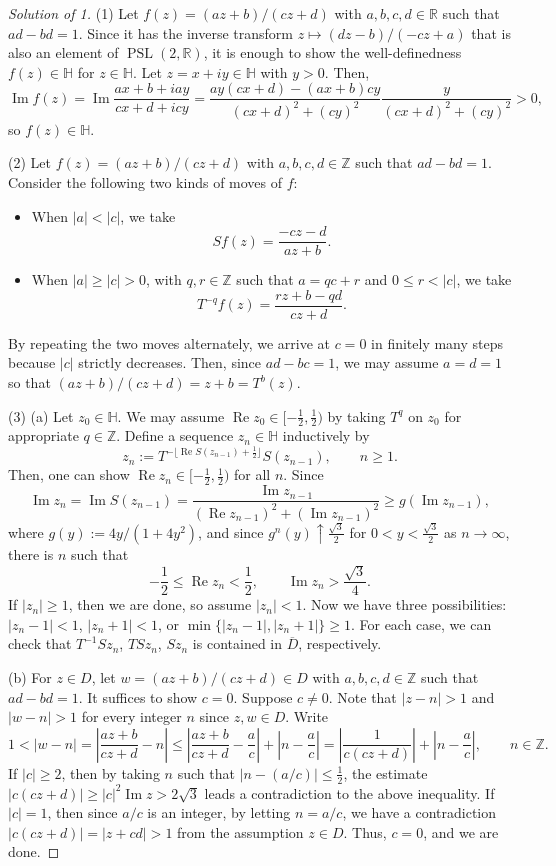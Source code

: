 \documentclass[a4paper]{article}
\theoremstyle{definition}
\renewcommand{\Re}{\operatorname{Re}}
\renewcommand{\Im}{\operatorname{Im}}
\renewcommand{\H}{\mathbb{H}}
\newcommand{\R}{\mathbb{R}}
\newcommand{\Z}{\mathbb{Z}}
\newcommand{\PSL}{\operatorname{PSL}}
\renewcommand{\bar}{\overline}
\begin{document}
\begin{proof}[Solution of 1]
(1)
Let $f(z)=(az+b)/(cz+d)$ with $a,b,c,d\in\R$ such that $ad-bd=1$.
Since it has the inverse transform $z\mapsto(dz-b)/(-cz+a)$ that is also an element of $\PSL(2,\R)$, it is enough to show the well-definedness $f(z)\in\H$ for $z\in\H$.
Let $z=x+iy\in\H$ with $y>0$.
Then,
\[\Im f(z)=\Im\frac{ax+b+iay}{cx+d+icy}=\frac{ay(cx+d)-(ax+b)cy}{(cx+d)^2+(cy)^2}\frac y{(cx+d)^2+(cy)^2}>0,\]
so $f(z)\in\H$.

(2)
Let $f(z)=(az+b)/(cz+d)$ with $a,b,c,d\in\Z$ such that $ad-bd=1$.
Consider the following two kinds of moves of $f$:
\begin{itemize}
\item When $|a|<|c|$, we take
\[Sf(z)=\frac{-cz-d}{az+b}.\]
\item When $|a|\ge|c|>0$, with $q,r\in\Z$ such that $a=qc+r$ and $0\le r<|c|$, we take
\[T^{-q}f(z)=\frac{rz+b-qd}{cz+d}.\]
\end{itemize}
By repeating the two moves alternately, we arrive at $c=0$ in finitely many steps because $|c|$ strictly decreases.
Then, since $ad-bc=1$, we may assume $a=d=1$ so that $(az+b)/(cz+d)=z+b=T^b(z)$.


(3)
(a)
Let $z_0\in\H$.
We may assume $\Re z_0\in[-\frac12,\frac12)$ by taking $T^q$ on $z_0$ for appropriate $q\in\Z$.
Define a sequence $z_n\in\H$ inductively by
\[z_n:=T^{-\lfloor\Re S(z_{n-1})+\frac12\rfloor}S(z_{n-1}),\qquad n\ge1.\]
Then, one can show $\Re z_n\in[-\frac12,\frac12)$ for all $n$.
Since
\[\Im z_n=\Im S(z_{n-1})=\frac{\Im z_{n-1}}{(\Re z_{n-1})^2+(\Im z_{n-1})^2}\ge g(\Im z_{n-1}),\]
where $g(y):=4y/(1+4y^2)$, and since $g^n(y)\uparrow\frac{\sqrt3}2$ for $0<y<\frac{\sqrt3}2$ as $n\to\infty$, there is $n$ such that
\[-\frac12\le\Re z_n<\frac12,\qquad\Im z_n>\frac{\sqrt3}4.\]
If $|z_n|\ge1$, then we are done, so assume $|z_n|<1$.
Now we have three possibilities: $|z_n-1|<1$, $|z_n+1|<1$, or $\min\{|z_n-1|,|z_n+1|\}\ge1$.
For each case, we can check that $T^{-1}Sz_n$, $TSz_n$, $Sz_n$ is contained in $\bar D$, respectively.

(b)
For $z\in D$, let $w=(az+b)/(cz+d)\in D$ with $a,b,c,d\in\Z$ such that $ad-bd=1$.
It suffices to show $c=0$.
Suppose $c\ne0$.
Note that $|z-n|>1$ and $|w-n|>1$ for every integer $n$ since $z,w\in D$.
Write
\[1<|w-n|=\left|\frac{az+b}{cz+d}-n\right|\le\left|\frac{az+b}{cz+d}-\frac ac\right|+\left|n-\frac ac\right|=\left|\frac1{c(cz+d)}\right|+\left|n-\frac ac\right|,\qquad n\in\Z.\]
If $|c|\ge2$, then by taking $n$ such that $|n-(a/c)|\le\frac12$, the estimate $|c(cz+d)|\ge|c|^2\Im z>2\sqrt3$ leads a contradiction to the above inequality.
If $|c|=1$, then since $a/c$ is an integer, by letting $n=a/c$, we have a contradiction $|c(cz+d)|=|z+cd|>1$ from the assumption $z\in D$.
Thus, $c=0$, and we are done.


\end{proof}
\end{document}
